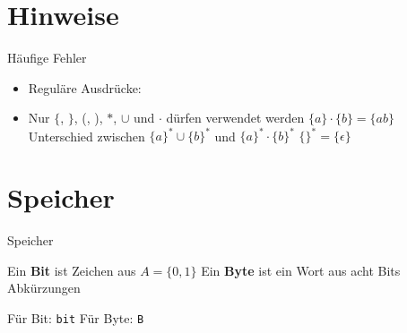 \documentclass[handout]{beamer}
\begin{document}

\begin{frame}
	\titlepage
\end{frame}

\renewcommand{\ip}{} %

\renewenvironment{taskblock}[1]{\textbf{Aufgabe: #1}\\}{}
\renewcommand{\markBlue}[1]{\textbf{#1}}
\renewcommand{\markGreen}[1]{\textbf{#1}}

\section{Hinweise}

\begin{frame} {Häufige Fehler}
\begin{itemize}
	\item Reguläre Ausdrücke:
	\item Nur $\{$, $\}$, (, ), $*$, $\cup$ und $\cdot$ dürfen verwendet werden
	\pitem $\{a\} \cdot \{b\} = \{ab\}$
	\pitem Unterschied zwischen $\{a\}^* \cup \{b\}^*$ und $\{a\}^* \cdot \{b\}^*$
    \pitem $\{\}^* = \{\epsilon\}$
\end{itemize}
\end{frame}

\section{Speicher}

\begin{frame}{Speicher}
	\begin{itemize}
		\pitem Ein \textbf{Bit} ist Zeichen aus $A = \{0, 1\}$
		\pitem Ein \textbf{Byte} ist ein Wort aus acht Bits
		\pitem Abkürzungen
		\begin{itemize}
			\pitem Für Bit: \texttt{bit}
			\pitem Für Byte: \texttt{B}
		\end{itemize}
	\end{itemize}
\end{frame}
\end{document}
